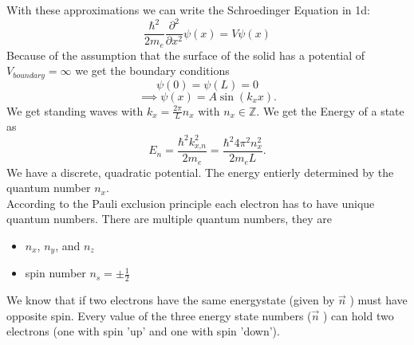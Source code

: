 \documentclass{report}
\begin{document}
With these approximations we can write the Schroedinger Equation in 1d: \[
	\frac{\hbar^2}{2m_e} \frac{\partial^2}{\partial x^2} \psi(x) = V \psi(x)
\] Because of the assumption that the surface of the solid has a potential of $V_{boundary} = \infty$ we get the boundary conditions  \[
\psi(0) = \psi(L) = 0
\] \[
\implies \psi(x) = A \sin\left( k_x x \right) 
.\] We get standing waves with $k_x = \frac{2\pi}{L} n_x$ with $n_x \in \mathbb{Z}$.  
We get the Energy of a state as \[
	E_n = \frac{\hbar^2 k_{x\text{,}n}^2}{2 m_e} = \frac{\hbar^2 4 \pi^2 n_x^2}{2 m_e L}
.\] 
We have a discrete, quadratic potential. The energy entierly determined by the quantum number $n_x$.\\
According to the Pauli exclusion principle each electron has to have unique quantum numbers. There are multiple quantum numbers, they are
\begin{itemize}
	\item $n_x$, $n_y$, and $n_z$ 
	\item spin number $n_s = \pm \frac{1}{2}$
\end{itemize}
We know that if two electrons have the same energystate (given by $\vec{n}$ ) must have opposite spin.
Every value of the three energy state numbers ($\vec{n}$ ) can hold two electrons (one with spin 'up' and one with spin 'down'). \\
\end{document}
